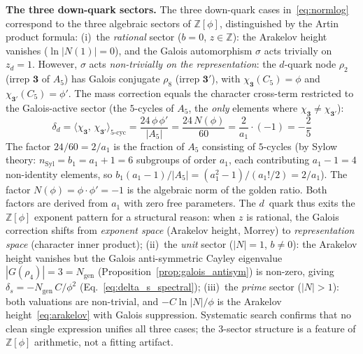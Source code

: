\documentclass[12pt,a4paper]{article}
\theoremstyle{definition}
\begin{document}
\textbf{The three down-quark sectors.}  The three down-quark cases in~\eqref{eq:normlog} correspond to the three algebraic sectors of $\mathbb{Z}[\phi]$, distinguished by the Artin product formula: (i)~the \emph{rational} sector ($b = 0$, $z \in \mathbb{Z}$): the Arakelov height vanishes ($\ln|N(1)| = 0$), and the Galois automorphism $\sigma$ acts trivially on $z_d = 1$.  However, $\sigma$ acts \emph{non-trivially on the representation}: the $d$-quark node $\rho_2$ (irrep $\mathbf{3}$ of $A_5$) has Galois conjugate $\rho_8$ (irrep $\mathbf{3'}$), with $\chi_{\mathbf{3}}(C_5) = \phi$ and $\chi_{\mathbf{3'}}(C_5) = \phi'$.  The mass correction equals the character cross-term restricted to the Galois-active sector (the $5$-cycles of $A_5$, the \emph{only} elements where $\chi_{\mathbf{3}} \neq \chi_{\mathbf{3'}}$):
\begin{equation}
\delta_d = \bigl\langle\chi_{\mathbf{3}},\,\chi_{\mathbf{3'}}\bigr\rangle_{\!\text{5-cyc}}
= \frac{24\,\phi\,\phi'}{|A_5|}
= \frac{24\,N(\phi)}{60}
= \frac{2}{a_1}\cdot(-1)
= -\frac{2}{5}
\label{eq:delta_d_galois}
\end{equation}
The factor $24/60 = 2/a_1$ is the fraction of $A_5$ consisting of $5$-cycles (by Sylow theory: $n_{\mathrm{Syl}} = b_1 = a_1 + 1 = 6$ subgroups of order $a_1$, each contributing $a_1 - 1 = 4$ non-identity elements, so $b_1(a_1-1)/|A_5| = (a_1^2-1)/(a_1!/2) = 2/a_1$).  The factor $N(\phi) = \phi\cdot\phi' = -1$ is the algebraic norm of the golden ratio.  Both factors are derived from $a_1$ with zero free parameters.  The $d$~quark thus exits the $\mathbb{Z}[\phi]$ exponent pattern for a structural reason: when $z$ is rational, the Galois correction shifts from \emph{exponent space} (Arakelov height, Morrey) to \emph{representation space} (character inner product); (ii)~the \emph{unit} sector ($|N| = 1$, $b \neq 0$): the Arakelov height vanishes but the Galois anti-symmetric Cayley eigenvalue $|G(\rho_4)| = 3 = N_{\text{gen}}$ (Proposition~\ref{prop:galois_antisym}) is non-zero, giving $\delta_s = -N_{\text{gen}}\,C/\phi^2$ (Eq.~\ref{eq:delta_s_spectral}); (iii)~the \emph{prime} sector ($|N| > 1$): both valuations are non-trivial, and $-C\ln|N|/\phi$ is the Arakelov height~\eqref{eq:arakelov} with Galois suppression.  Systematic search confirms that no clean single expression unifies all three cases; the 3-sector structure is a feature of $\mathbb{Z}[\phi]$ arithmetic, not a fitting artifact.
\end{document}
